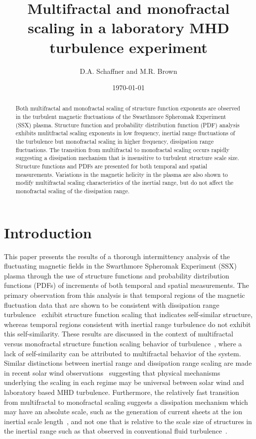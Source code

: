 \documentclass[preprint2]{aastex}
\begin{document}
\title{Multifractal and monofractal scaling in a laboratory MHD turbulence experiment}

\author{D.A. Schaffner and M.R. Brown}

\date{\today}
\begin{abstract}
Both multifractal and monofractal scaling of structure function exponents are observed in the turbulent magnetic fluctuations of the Swarthmore Spheromak Experiment (SSX) plasma. Structure function and probability distribution function (PDF) analysis exhibits mulitfractal scaling exponents in low frequency, inertial range fluctuations of the turbulence but monofractal scaling in higher frequency, dissipation range fluctuations. The transition from multifractal to monofractal scaling occurs rapidly suggesting a dissipation mechanism that is insensitive to turbulent structure scale size. Structure functions and PDFs are presented for both temporal and spatial measurements. Variations in the magnetic helicity in the plasma are also shown to modify multifractal scaling characteristics of the inertial range, but do not affect the monofractal scaling of the dissipation range.
\end{abstract}


\section{Introduction}

This paper presents the results of a thorough intermittency analysis of the fluctuating magnetic fields in the Swarthmore Spheromak Experiment (SSX) plasma through the use of structure functions and probability distribution functions (PDFs) of increments of both temporal and spatial measurements. The primary observation from this analysis is that temporal regions of the magnetic fluctuation data that are shown to be consistent with dissipation range turbulence~\citep{schaffner2014c} exhibit structure function scaling that indicates self-similar structure, whereas temporal regions consistent with inertial range turbulence do not exhibit this self-similarity. These results are discussed in the context of multifractal versus monofractal structure function scaling behavior of turbulence~\citep{paladin1987,frisch1995,marsch1997}, where a lack of self-similarity can be attributed to multifractal behavior of the system. Similar distinctions between inertial range and dissipation range scaling are made in recent solar wind observations~\citep{kiyani2013} suggesting that physical mechanisms underlying the scaling in each regime may be universal between solar wind and laboratory based MHD turbulence. Furthermore, the relatively fast transition from multifractal to monofractal scaling suggests a dissipation mechanism which may have an absolute scale, such as the generation of current sheets at the ion inertial scale length~\citep{kiyani2009,kiyani2010}, and not one that is relative to the scale size of structures in the inertial range such as that observed in conventional fluid turbulence~\citep{chevillard2005}.
\end{document}

